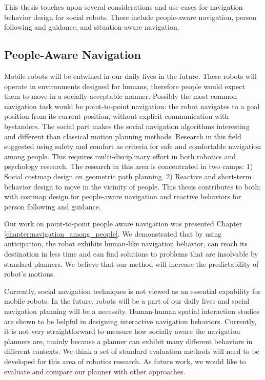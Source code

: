 This thesis touches upon several considerations and use cases for navigation behavior design for social robots. These include people-aware navigation, person following and guidance, and situation-aware navigation.

\subsection{People-Aware Navigation}

Mobile robots will be entwined in our daily lives in the future. These robots will operate in environments designed for humans, therefore people would expect them to move in a socially acceptable manner. Possibly the most common navigation task would be point-to-point navigation: the robot navigates to a goal position from its current position, without explicit communication with bystanders. The social part makes the social navigation algorithms interesting and different than classical motion planning methods. Research in this field suggested using safety and comfort as criteria for safe and comfortable navigation among people. This requires multi-disciplinary effort in both robotics and psychology research. The research in this area is concentrated in two camps: 1) Social costmap design on geometric path planning. 2) Reactive and short-term behavior design to move in the vicinity of people. This thesis contributes to both: with costmap design for people-aware navigation and reactive behaviors for person following and guidance.

Our work on point-to-point people aware navigation was presented Chapter \ref{chapter:navigation_among_people}. We demonstrated that by using anticipation, the robot exhibits human-like navigation behavior, can reach its destination in less time and can find solutions to problems that are insolvable by standard planners. We believe that our method will increase the predictability of robot’s motions.
	
	
Currently, social navigation techniques is not viewed as an essential capability for mobile robots. In the future, robots will be a part of our daily lives and social navigation planning will be a necessity. Human-human spatial interaction studies are shown to be helpful in designing interactive navigation behaviors. Currently, it is not very straightforward to measure how socially aware the navigation planners are, mainly because a planner can exhibit many different behaviors in different contexts. We think a set of standard evaluation methods will need to be developed for this area of robotics research. As future work, we would like to evaluate and compare our planner with other approaches. 

